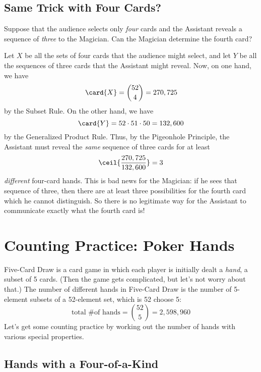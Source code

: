\subsection{Same Trick with Four Cards?}\label{4_card_trick_subsec}

Suppose that the audience selects only \emph{four} cards and the
Assistant reveals a sequence of \emph{three} to the Magician.  Can
the Magician determine the fourth card?

Let $X$ be all the sets of four cards that the audience might select,
and let $Y$ be all the sequences of three cards that the Assistant
might reveal.  Now, on one hand, we have
\[
\card{X} = \binom{52}{4} = 270,725
\]
by the Subset Rule.  On the other hand, we have
\[
\card{Y} = 52 \cdot 51 \cdot 50 = 132,600
\]
by the Generalized Product Rule.  Thus, by the Pigeonhole Principle, the
Assistant must reveal the \emph{same} sequence of three cards for at
least
\[
\ceil{\frac{270,725}{132,600}} = 3
\]
\emph{different} four-card hands.  This is bad news for the Magician:
if he sees that sequence of three, then there are at least three
possibilities for the fourth card which he cannot distinguish.  So there
is no legitimate way for the Assistant to communicate exactly what the
fourth card is!


\begin{problems}
\classproblems
{}

\homeworkproblems


\end{problems}


\section{Counting Practice: Poker Hands}\label{poker hands}

Five-Card Draw is a card game in which each player is initially dealt
a \emph{hand}, a subset of 5 cards.  (Then the game gets
complicated, but let's not worry about that.)  The number of different
hands in Five-Card Draw is the number of 5-element subsets of a
52-element set, which is 52 choose 5:
%
\[
\text{total \# of hands} = \binom{52}{5} = 2,598,960
\]
%
Let's get some counting practice by working out the number of hands
with various special properties.

\subsection{Hands with a Four-of-a-Kind}

